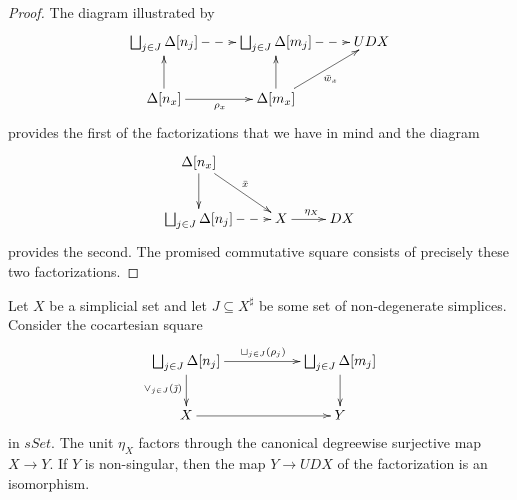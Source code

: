 \begin{proof}
The diagram illustrated by
\begin{displaymath}
\xymatrix{
\bigsqcup _{j\in J}\Delta [n_j] \ar@{-->}[r] & \bigsqcup _{j\in J}\Delta [m_j] \ar@{-->}[r] & UDX \\
\Delta [n_x] \ar[u] \ar[r]_{\rho _x} & \Delta [m_x] \ar[u] \ar[ur]_{\bar{w} _x}
}
\end{displaymath}
provides the first of the factorizations that we have in mind and the diagram
\begin{displaymath}
\xymatrix{
\Delta [n_x] \ar[d] \ar[dr]^{\bar{x} } \\
\bigsqcup _{j\in J}\Delta [n_j] \ar@{-->}[r] & X \ar[r]^{\eta _X} & DX
}
\end{displaymath}
provides the second. The promised commutative square consists of precisely these two factorizations.
\end{proof}
\begin{lemma}\label{lem:pushout_along_enforcers_intermediate_desingularization}
Let $X$ be a simplicial set and let $J\subseteq X^\sharp$ be some set of non-degenerate simplices. Consider the cocartesian square
\begin{displaymath}
\xymatrix{
\bigsqcup _{j\in J}\Delta [n_{j}] \ar[rr]^{\sqcup _{j\in J}(\rho _j)} \ar[d]_{\vee _{j\in J}(\bar{\jmath } )} && \bigsqcup _{j\in J}\Delta [m_j] \ar[d] \\
X \ar[rr] && Y
}
\end{displaymath}
in $sSet$. The unit $\eta _X$ factors through the canonical degreewise surjective map $X\to Y$. If $Y$ is non-singular, then the map $Y\to UDX$ of the factorization is an isomorphism.
\end{lemma}
